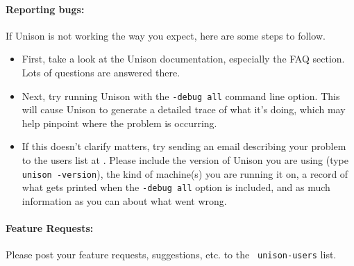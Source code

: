 \paragraph{Reporting bugs:}

If Unison is not working the way you expect, here are some steps to 
follow.
\begin{itemize}
\item First, take a look at the Unison documentation, especially the
FAQ section.  Lots of questions are answered there.

\item Next, try running Unison with the {\tt -debug all} command line
option.  This will cause Unison to generate a detailed trace of what it's
doing, which may help pinpoint where the problem is occurring.

\item If this doesn't clarify matters, try sending an email describing
your problem to the users list at
.  
Please include the version of Unison you are using (type {\tt unison
  -version}), the kind of machine(s) you are running it on, a record of
what gets printed when the {\tt -debug all} option is included, and as
much information as you can about what went wrong.
\end{itemize}

\paragraph{Feature Requests:}

Please post your feature requests, suggestions, etc. to the {\tt
  unison-users} list.   

